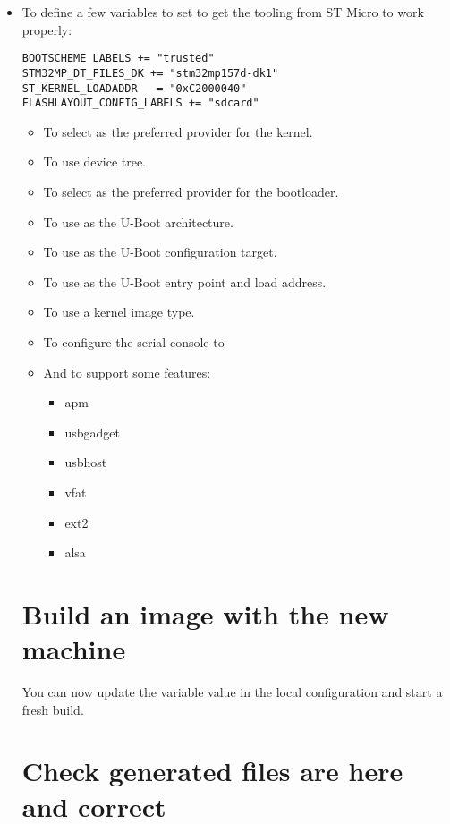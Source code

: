 \if{}
\begin{itemize}
  \item To define a few variables to set to get the tooling from ST
    Micro to work properly:
\begin{verbatim}
BOOTSCHEME_LABELS += "trusted"
STM32MP_DT_FILES_DK += "stm32mp157d-dk1"
ST_KERNEL_LOADADDR   = "0xC2000040"
FLASHLAYOUT_CONFIG_LABELS += "sdcard"
\end{verbatim}
\else
\begin{itemize}
  \item To select  as the preferred provider
    for the kernel.
  \item To use  device tree.
  \item To select  as the preferred provider
    for the bootloader.
  \item To use  as the U-Boot architecture.
  \item To use  as the U-Boot
    configuration target.
  \item To use  as the U-Boot entry point and load
    address.
  \item To use a  kernel image type.
  \item To configure the serial console to 
\fi
  \item And to support some features:
    \begin{itemize}
      \item apm
      \item usbgadget
      \item usbhost
      \item vfat
      \item ext2
      \item alsa
    \end{itemize}
\end{itemize}
\section{Build an image with the new machine}

You can now update the  variable value in the local configuration
and start a fresh build.

\section{Check generated files are here and correct}


\end{itemize}
